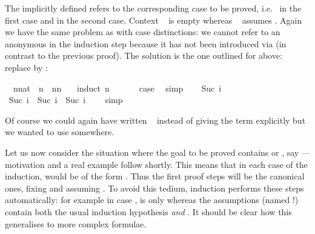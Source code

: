 \begin{isabellebody}
\begin{isamarkuptext}
\noindent The implicitly defined  refers to the
corresponding case to be proved, i.e.\  in the first case and
 in the second case. Context ~ is
empty whereas ~ assumes . Again we
have the same problem as with case distinctions: we cannot refer to an anonymous 
in the induction step because it has not been introduced via 
(in contrast to the previous proof). The solution is the one outlined for
 above: replace  by :%
\end{isamarkuptext}%
\isamarkuptrue%
\ \ n{\isacharcolon}{\isacharcolon}nat\ \ {\isachardoublequote}n\ {\isacharless}\ n{\isacharasterisk}n\ {\isacharplus}\ {}{\isachardoublequote}\isanewline
\isamarkupfalse%
\ {\isacharparenleft}induct\ n{\isacharparenright}\isanewline
\ \ \isamarkupfalse%
\ {}\ \isamarkupfalse%
\ {\isacharquery}case\ \isamarkupfalse%
\ simp\isanewline
\isamarkupfalse%
\isanewline
\ \ \isamarkupfalse%
\ {\isacharparenleft}Suc\ i{\isacharparenright}\ \isamarkupfalse%
\ {\isachardoublequote}Suc\ i\ {\isacharless}\ Suc\ i\ {\isacharasterisk}\ Suc\ i\ {\isacharplus}\ {}{\isachardoublequote}\ \isamarkupfalse%
\ simp\isanewline
\isamarkupfalse%
\isamarkupfalse%
%
\begin{isamarkuptext}%
\noindent Of course we could again have written
~ instead of giving the term explicitly
but we wanted to use  somewhere.%
\end{isamarkuptext}%
\isamarkuptrue%
%
\isamarkuptrue%
%
\begin{isamarkuptext}%
Let us now consider the situation where the goal to be proved contains
\isa{{\isasymAnd}} or \isa{{\isasymLongrightarrow}}, say  --- motivation and a
real example follow shortly.  This means that in each case of the induction,
 would be of the form .  Thus the
first proof steps will be the canonical ones, fixing  and assuming
. To avoid this tedium, induction performs these steps
automatically: for example in case ,  is only
 whereas the assumptions (named !) contain both the
usual induction hypothesis \emph{and} .
It should be clear how this generalises to more complex formulae.


\end{isamarkuptext}
\end{isabellebody}
